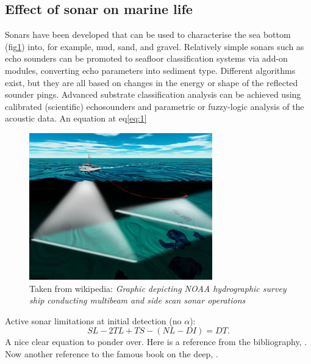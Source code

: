 \documentclass[12pt,twocolumn]{article}
\begin{document}
\subsection{Effect of sonar on marine life}
Sonars have been developed that can be used to characterise the sea bottom (fig\ref{fig:sample2}) into, for example, mud, sand, and gravel. Relatively simple sonars such as echo sounders can be promoted to seafloor classification systems via add-on modules, converting echo parameters into sediment type. Different algorithms exist, but they are all based on changes in the energy or shape of the reflected sounder pings. Advanced substrate classification analysis can be achieved using calibrated (scientific) echosounders and parametric or fuzzy-logic analysis of the acoustic data. An equation at eq\ref{eq:1}
\begin{figure}
\includegraphics[scale=0.4]{pics/seabedWikiPic}
\caption{\label{fig:sample2}Taken from wikipedia: \emph{Graphic depicting NOAA hydrographic survey ship conducting multibeam and side scan sonar operations}}
\end{figure}

Active sonar limitations at initial detection (no $\alpha$):
\begin{equation}
  \label{eq:1}
SL - 2TL + TS - (NL-DI) = DT.
\end{equation}
A nice clear equation to ponder over. Here is a reference from the bibliography, \cite{gortney2010department}.
Now another reference to the famous book on the deep, \cite{cousteau1953silent}.


 
\end{document}
